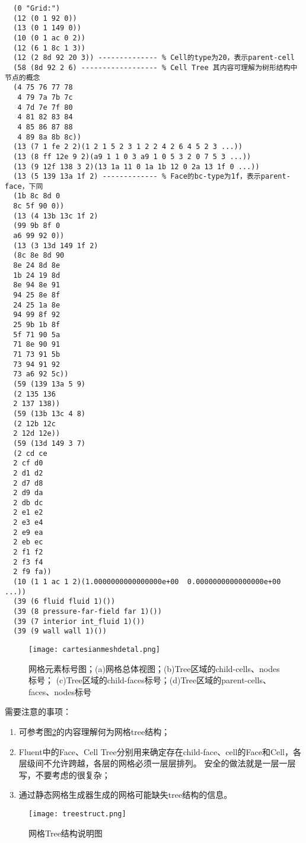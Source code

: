 \documentclass[lang=cn,11pt,a4paper]{elegantpaper} %
\begin{document}
\begin{lstlisting}
  (0 "Grid:")
  (12 (0 1 92 0))
  (13 (0 1 149 0))
  (10 (0 1 ac 0 2))
  (12 (6 1 8c 1 3))
  (12 (2 8d 92 20 3)) -------------- % Cell的type为20，表示parent-cell
  (58 (8d 92 2 6) ------------------ % Cell Tree 其内容可理解为树形结构中节点的概念
  (4 75 76 77 78
   4 79 7a 7b 7c
   4 7d 7e 7f 80
   4 81 82 83 84
   4 85 86 87 88
   4 89 8a 8b 8c))
  (13 (7 1 fe 2 2)(1 2 1 5 2 3 1 2 2 4 2 6 4 5 2 3 ...))
  (13 (8 ff 12e 9 2)(a9 1 1 0 3 a9 1 0 5 3 2 0 7 5 3 ...))
  (13 (9 12f 138 3 2)(13 1a 11 0 1a 1b 12 0 2a 13 1f 0 ...))
  (13 (5 139 13a 1f 2) ------------- % Face的bc-type为1f，表示parent-face，下同
  (1b 8c 8d 0
  8c 5f 90 0))
  (13 (4 13b 13c 1f 2)
  (99 9b 8f 0
  a6 99 92 0))
  (13 (3 13d 149 1f 2)
  (8c 8e 8d 90
  8e 24 8d 8e
  1b 24 19 8d
  8e 94 8e 91
  94 25 8e 8f
  24 25 1a 8e
  94 99 8f 92
  25 9b 1b 8f
  5f 71 90 5a
  71 8e 90 91
  71 73 91 5b
  73 94 91 92
  73 a6 92 5c))
  (59 (139 13a 5 9)
  (2 135 136
  2 137 138))
  (59 (13b 13c 4 8)
  (2 12b 12c
  2 12d 12e))
  (59 (13d 149 3 7)
  (2 cd ce
  2 cf d0
  2 d1 d2
  2 d7 d8
  2 d9 da
  2 db dc
  2 e1 e2
  2 e3 e4
  2 e9 ea
  2 eb ec
  2 f1 f2
  2 f3 f4
  2 f9 fa))
  (10 (1 1 ac 1 2)(1.0000000000000000e+00  0.0000000000000000e+00 ...))
  (39 (6 fluid fluid 1)())
  (39 (8 pressure-far-field far 1)())
  (39 (7 interior int_fluid 1)())
  (39 (9 wall wall 1)())
\end{lstlisting}

\begin{figure}[!htb]
  \centering
  \texttt{[image: cartesianmeshdetal.png]}
  \caption{网格元素标号图；(a)网格总体视图；(b)Tree区域的child-cells、nodes标号；
                          (c)Tree区域的child-faces标号；(d)Tree区域的parent-cells、faces、nodes标号}
  \label{cartesianmeshdetal}
\end{figure}

需要注意的事项：
\begin{enumerate}
  \item 可参考图\ref{treestruct}的内容理解何为网格tree结构；
  \item Fluent中的Face、Cell Tree分别用来确定存在child-face、cell的Face和Cell，各层级间不允许跨越，各层的网格必须一层层排列。
        安全的做法就是一层一层写，不要考虑的很复杂；
  \item 通过静态网格生成器生成的网格可能缺失tree结构的信息。
\end{enumerate}

\begin{figure}[!htb]
  \centering
  \texttt{[image: treestruct.png]}
  \caption{网格Tree结构说明图}
  \label{treestruct}
\end{figure}
\end{document}
